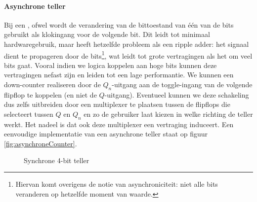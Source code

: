\paragraph{Asynchrone teller}
Bij een ,  ofwel  wordt de verandering van de bittoestand van \'e\'en van de bits gebruikt als klokingang voor de volgende bit. Dit leidt tot minimaal hardwaregebruik, maar heeft hetzelfde probleem als een ripple adder: het signaal dient te propageren door de bits\footnote{Hiervan komt overigens de notie van asynchroniciteit: niet alle bits veranderen op hetzelfde moment van waarde.}, wat leidt tot grote vertragingen als het om veel bits gaat. Vooral indien we logica koppelen aan hoge bits kunnen deze vertragingen nefast zijn en leiden tot een lage performantie. We kunnen een down-counter realiseren door de $Q_n$-uitgang aan de toggle-ingang van de volgende flipflop te koppelen (en niet de $Q$-uitgang). Eventueel kunnen we deze schakeling dus zelfs uitbreiden door een multiplexer te plaatsen tussen de flipflops die selecteert tussen $Q$ en $Q_n$ en zo de gebruiker laat kiezen in welke richting de teller werkt. Het nadeel is dat ook deze multiplexer een vertraging induceert. Een eenvoudige implementatie van een asynchrone teller staat op figuur \ref{fig:asynchroneCounter}.
\begin{figure}[hbt]
\centering
{}
\caption{Synchrone 4-bit teller}
\label{fig:synchroneCounter}
\end{figure}
